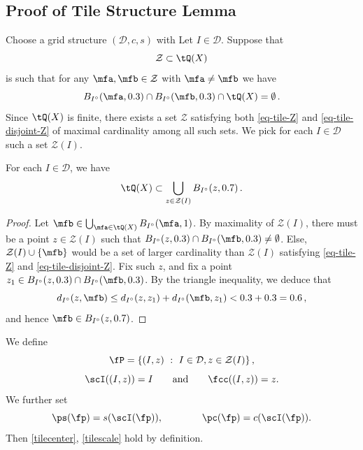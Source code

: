 \subsection{Proof of Tile Structure Lemma}
\label{subsectiles}
Choose a grid structure $(\mathcal{D}, c, s)$ with 
Let $I \in \mathcal{D}$. Suppose that
\begin{equation}
    \label{eq-tile-Z}
    \mathcal{Z} \subset \tQ(X)
\end{equation}
is such that for any $\mfa, \mfb \in \mathcal{Z}$ with $\mfa\ne \mfb$ we have
\begin{equation}
    \label{eq-tile-disjoint-Z}
    B_{I^\circ}(\mfa, 0.3) \cap B_{I^\circ}(\mfb, 0.3) \cap \tQ(X) = \emptyset\,.
\end{equation}
Since $\tQ(X)$ is finite, there exists a set $\mathcal{Z}$ satisfying both \eqref{eq-tile-Z} and \eqref{eq-tile-disjoint-Z} of maximal cardinality among all such sets. We pick for each $I \in \mathcal{D}$ such a set $\mathcal{Z}(I)$.

\begin{lemma}
    \label{frequency-ball-cover}
    \leanok
    For each $I \in \mathcal{D}$, we have
    \begin{equation}
        \label{eq-tile-cover}
        \tQ(X) \subset \bigcup_{z \in \mathcal{Z}(I)} B_{I^\circ}(z, 0.7)\,.
    \end{equation}
\end{lemma}

\begin{proof}
    \leanok
    Let $\mfb \in \bigcup_{\mfa \in \tQ(X)} B_{I^\circ}(\mfa, 1)$. By maximality of $\mathcal{Z}(I)$, there must be a point $z \in \mathcal{Z}(I)$ such that $B_{I^\circ}(z, 0.3) \cap B_{I^\circ}(\mfb, 0.3) \ne \emptyset$. Else, $\mathcal{Z}(I) \cup \{\mfb\}$ would be a set of larger cardinality than $\mathcal{Z}(I)$ satisfying \eqref{eq-tile-Z} and \eqref{eq-tile-disjoint-Z}. Fix such $z$, and fix a point $z_1 \in B_{I^\circ}(z, 0.3) \cap B_{I^\circ}(\mfb, 0.3)$. By the triangle inequality, we deduce that
    $$
        d_{I^\circ}(z,\mfb) \le d_{I^\circ}(z,z_1) + d_{I^\circ}(\mfb, z_1) < 0.3 + 0.3 = 0.6\,,
    $$
    and hence $\mfb \in B_{I^\circ}(z, 0.7)$.
\end{proof}

We define
$$
    \fP = \{(I, z) \ : \ I \in \mathcal{D}, z \in \mathcal{Z}(I)\}\,,
$$
$$\scI((I, z)) = I\qquad \text{and} \qquad \fcc((I, z)) = z.$$ We further set $$\ps(\fp) = s(\scI(\fp)),\qquad \qquad \pc(\fp) = c(\scI(\fp)).$$ Then \eqref{tilecenter}, \eqref{tilescale} hold by definition.

